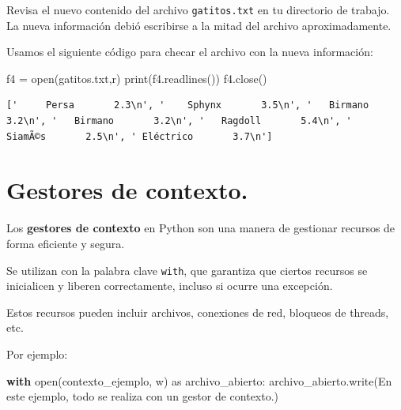 \documentclass[
  spanish,
  letterpaper,
]{scrbook}
\newenvironment{Shaded}{\begin{snugshade}}{\end{snugshade}}
\newcommand{\BuiltInTok}[1]{\textcolor[rgb]{0.00,0.23,0.31}{#1}}
\newcommand{\ControlFlowTok}[1]{\textcolor[rgb]{0.00,0.23,0.31}{\textbf{#1}}}
\newcommand{\ImportTok}[1]{\textcolor[rgb]{0.00,0.46,0.62}{#1}}
\newcommand{\NormalTok}[1]{\textcolor[rgb]{0.00,0.23,0.31}{#1}}
\newcommand{\OperatorTok}[1]{\textcolor[rgb]{0.37,0.37,0.37}{#1}}
\newcommand{\StringTok}[1]{\textcolor[rgb]{0.13,0.47,0.30}{#1}}
\theoremstyle{definition}
\theoremstyle{remark}
\begin{document}
Revisa el nuevo contenido del archivo \texttt{gatitos.txt} en tu
directorio de trabajo. La nueva información debió escribirse a la mitad
del archivo aproximadamente.

Usamos el siguiente código para checar el archivo con la nueva
información:

\begin{Shaded}
\begin{Highlighting}[]
\NormalTok{f4 }\OperatorTok{=} \BuiltInTok{open}\NormalTok{(}\StringTok{\textquotesingle{}gatitos.txt\textquotesingle{}}\NormalTok{,}\StringTok{\textquotesingle{}r\textquotesingle{}}\NormalTok{)}
\BuiltInTok{print}\NormalTok{(f4.readlines())}
\NormalTok{f4.close()}
\end{Highlighting}
\end{Shaded}

\begin{verbatim}
['     Persa       2.3\n', '    Sphynx       3.5\n', '   Birmano       3.2\n', '   Birmano       3.2\n', '   Ragdoll       5.4\n', '    SiamÃ©s       2.5\n', ' Eléctrico       3.7\n']
\end{verbatim}

\section{Gestores de contexto.}\label{sec-g-gestos-contexto}

Los \textbf{gestores de contexto} en Python son una manera de gestionar
recursos de forma eficiente y segura.

Se utilizan con la palabra clave \texttt{with}, que garantiza que
ciertos recursos se inicialicen y liberen correctamente, incluso si
ocurre una excepción.

Estos recursos pueden incluir archivos, conexiones de red, bloqueos de
threads, etc.

Por ejemplo:

\begin{Shaded}
\begin{Highlighting}[]
\ControlFlowTok{with} \BuiltInTok{open}\NormalTok{(}\StringTok{\textquotesingle{}contexto\_ejemplo\textquotesingle{}}\NormalTok{, }\StringTok{\textquotesingle{}w\textquotesingle{}}\NormalTok{) }\ImportTok{as}\NormalTok{ archivo\_abierto:}
\NormalTok{    archivo\_abierto.write(}\StringTok{\textquotesingle{}En este ejemplo, todo se realiza con un gestor de contexto.\textquotesingle{}}\NormalTok{)}
\end{Highlighting}
\end{Shaded}
\end{document}
